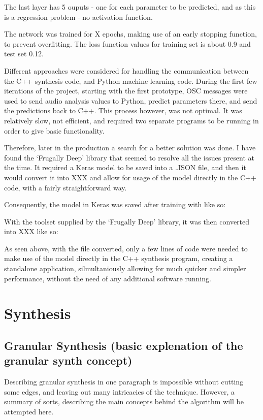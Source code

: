 The last layer has 5 ouputs - one for each parameter to be predicted,
and as this is a regression problem - no activation function.

The network was trained for X epochs, making use of an early stopping
function, to prevent overfitting. The loss function values for training
set is about 0.9 and test set 0.12.

Different approaches were considered for handling the communication
between the C++ synthesis code, and Python machine learning
code. During the first few iterations of the project, starting with
the first prototype, OSC messages were used to send audio analysis
values to Python, predict parameters there, and send the predictions
back to C++. This process however, was not optimal. It was relatively
slow, not efficient, and required two separate programs to be running
in order to give basic functionality.

Therefore, later in the production a search for a better solution was
done. I have found the `Frugally Deep' library that seemed to resolve all the
issues present at the time. It required a Keras model to be saved into
a .JSON file, and then it would convert it into XXX and allow for
usage of the model directly in the C++ code, with a fairly
straightforward way. 

Consequently, the model in Keras was saved after training with like so:

With the toolset supplied by the `Frugally Deep' library, it was then
converted into XXX like so:

As seen above, with the file converted, only a few lines of code were
needed to make use of the model directly in the C++ synthesis program,
creating a standalone application, silmultaniously allowing for much
quicker and simpler performance, without the need of any additional
software running.

\section{Synthesis}

\subsection{Granular Synthesis (basic explenation of the granular synth concept)}

Describing granular synthesis in one paragraph is impossible
without cutting some edges, and leaving out many intricacies of the
technique. However, a summary of sorts, describing the main concepts
behind the algorithm will be attempted here. 

